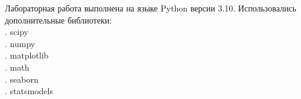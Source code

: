 \documentclass[../main.tex]{subfiles}
\begin{document}
    \noindent Лабораторная работа выполнена на языке Python версии 3.10. 
    \newline Использовались дополнительные библиотеки:\\
        . scipy\\
        . numpy\\
        . matplotlib\\
        . math\\
        . seaborn\\
        . statsmodels\\
\end{document}
